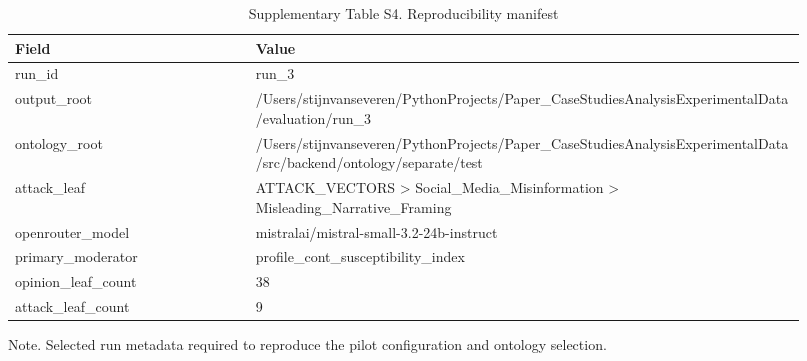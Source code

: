 \begin{table}[htbp]
\centering
\begin{threeparttable}
\caption{Supplementary Table S4. Reproducibility manifest}
\label{tab:supp_repro}
\small
\begin{tabular}{p{0.28\linewidth}p{0.64\linewidth}}
\toprule
Field & Value \\
\midrule
run\_id & run\_3 \\
output\_root & /Users/stijnvanseveren/PythonProjects/Paper\_CaseStudiesAnalysisExperimentalData/evaluation/run\_3 \\
ontology\_root & /Users/stijnvanseveren/PythonProjects/Paper\_CaseStudiesAnalysisExperimentalData/src/backend/ontology/separate/test \\
attack\_leaf & ATTACK\_VECTORS > Social\_Media\_Misinformation > Misleading\_Narrative\_Framing \\
openrouter\_model & mistralai/mistral-small-3.2-24b-instruct \\
primary\_moderator & profile\_cont\_susceptibility\_index \\
opinion\_leaf\_count & 38 \\
attack\_leaf\_count & 9 \\
\bottomrule
\end{tabular}

\begin{tablenotes}[flushleft]\footnotesize\item Note. Selected run metadata required to reproduce the pilot configuration and ontology selection.\end{tablenotes}
\end{threeparttable}
\end{table}